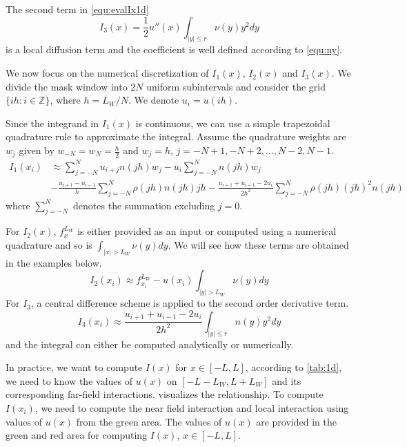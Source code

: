 \documentclass[10pt,a4paper]{article}
\theoremstyle{definition}
\begin{document}
The second term in \cref{equ:evalIx1d} 
\begin{equation}
	I_3(x) = \frac{1}{2}u''(x)\int_{|y|\leq r}\nu(y)y^2 dy
\end{equation}
is a local diffusion term and the coefficient is well defined according to \cref{equ:ny}.

We now focus on the numerical discretization of $I_1(x)$, $I_2(x)$ and $I_3(x)$. We divide the mask window into $2N$ uniform subintervals and consider the grid $\{ih:i\in\mathbb{Z} \}$, where $h = L_W/N$. We denote $u_i = u(ih)$.

Since the integrand in $I_1(x)$ is continuous, we can use a simple trapezoidal quadrature rule to approximate the integral. Assume the quadrature weights are $w_j$ given by $w_{-N}=w_N = \frac{h}{2}$ and $w_j=h$, $j=-N+1, -N+2, \ldots, N-2, N-1$.
\begin{equation}\label{equ:I1approx}
  \begin{aligned}
	I_1(x_i) &\approx \sum\limits_{j =  - N}^N {{u_{i + j}}n(jh){w_j}}  - {u_i}\sum\limits_{j =  - N}^N {n(jh){w_j}} \\
	& - \frac{{{u_{i + 1}} - {u_{i - 1}}}}{h}\sum\limits_{j =  - N}^N {\rho (jh)n(jh)jh}  - \frac{{{u_{i + 1}} + {u_{i - 1}} - 2{u_i}}}{{2{h^2}}}\sum\limits_{j =  - N}^N {\rho (jh){{(jh)}^2}n(jh)} 
\end{aligned}
\end{equation}
where $\sum\limits_{j =  - N}^N$ denotes the summation excluding $j=0$. 

For $I_2(x)$, $f_x^{L_W}$ is either provided as an input or computed using a numerical quadrature and so is $\int_{|x|>L_W} \nu(y)dy$. We will see how these terms are obtained in the examples below. 
\begin{equation}\label{equ:I2approx}
	I_2(x_i)\approx f_{x_i}^{L_W} - u(x_i)\int_{|y|> L_W}\nu(y)dy
\end{equation}
For $I_3$, a central difference scheme is applied to the second order derivative term. 
\begin{equation}\label{equ:I3approx}
	I_3(x_i)\approx \frac{{{u_{i + 1}} + {u_{i - 1}} - 2{u_i}}}{{2{h^2}}}\int_{|y| \leqslant r} n (y){y^2}dy
\end{equation}
and the integral can either be computed analytically or numerically. 


In practice, we want to compute $I(x)$ for $x\in [-L,L]$, according to \cref{tab:1d}, we need to know the values of $u(x)$ on $[-L-L_W,L+L_W]$ and its corresponding far-field interactions.  visualizes the relationship. To compute $I(x_i)$, we need to compute the near field interaction and local interaction using values of $u(x)$ from the green area. The values of $u(x)$ are provided in the green and red area for computing $I(x)$, $x\in [-L, L]$.
\end{document}
